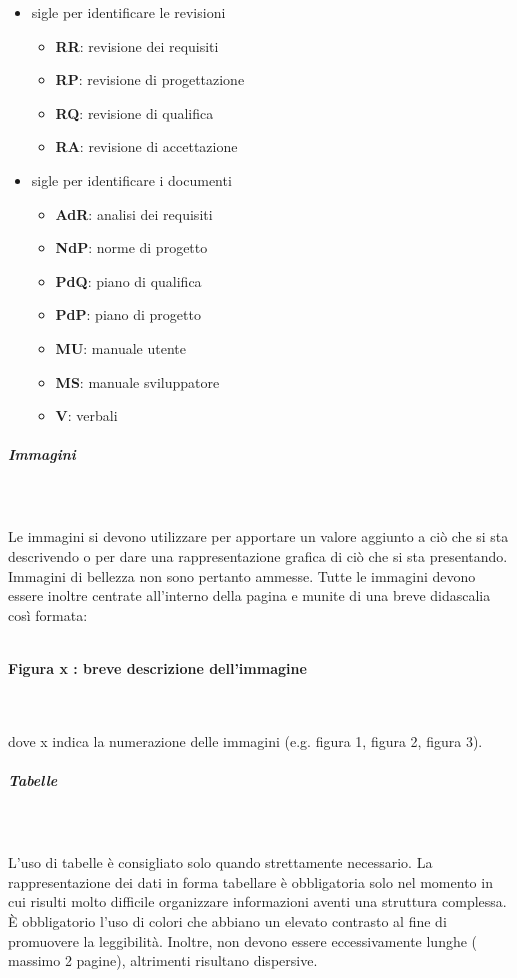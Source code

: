 \documentclass[../norme-di-progetto.tex]{subfiles}
\begin{document}
\begin{itemize}
	\item sigle per identificare le revisioni
	\begin{itemize}
		\item \textbf{RR}: revisione dei requisiti
		\item \textbf{RP}: revisione di progettazione
		\item \textbf{RQ}: revisione di qualifica
		\item \textbf{RA}: revisione di accettazione
	\end{itemize}
	\item sigle per identificare i documenti
	\begin{itemize}
		\item \textbf{AdR}: analisi dei requisiti
		\item \textbf{NdP}: norme di progetto
		\item \textbf{PdQ}: piano di qualifica
		\item \textbf{PdP}: piano di progetto
		\item \textbf{MU}: manuale utente
		\item \textbf{MS}: manuale sviluppatore
		\item \textbf{V}: verbali
 	\end{itemize}
 \end{itemize}
\subparagraph{Immagini}\mbox{}\\
\label{subp:immagini}
\\Le immagini si devono utilizzare per apportare un valore aggiunto a ciò che si sta descrivendo o per dare una rappresentazione grafica di ciò che si sta presentando. Immagini di bellezza non sono pertanto ammesse. Tutte le immagini devono essere inoltre centrate all'interno della pagina e munite di una breve didascalia così formata: \\\\\centerline{\textbf{Figura x : breve descrizione dell'immagine}} \\\\ dove x indica la numerazione delle immagini (e.g. figura 1, figura 2, figura 3).
\subparagraph{Tabelle}\mbox{}\\
\label{subp:tabelle}
\\L'uso di tabelle è consigliato solo quando strettamente necessario. La rappresentazione dei dati in forma tabellare è obbligatoria solo nel momento in cui risulti molto difficile organizzare informazioni aventi una struttura complessa. È obbligatorio l'uso di colori che abbiano un elevato contrasto al fine di promuovere la leggibilità. Inoltre, non devono essere eccessivamente lunghe ( massimo 2 pagine), altrimenti risultano dispersive.
\end{document}
